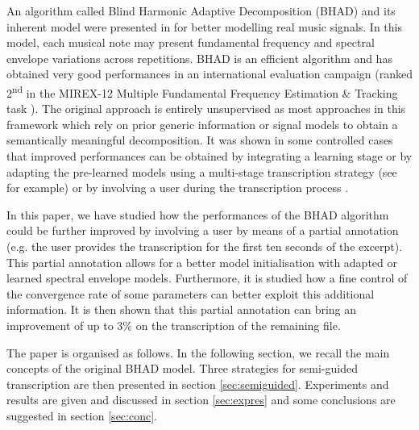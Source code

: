 \documentclass{article}
\begin{document}
\vspace{0.1cm}

An algorithm called Blind Harmonic Adaptive Decomposition (BHAD) and its inherent model were presented in \cite{Fuentes2012_EUSIPCO, Fuentes2013_PhD} for better modelling real music signals. In this model, each musical note may present fundamental frequency and spectral envelope variations across repetitions. BHAD is an efficient algorithm and has obtained very good performances in an international evaluation campaign (ranked 2\textsuperscript{nd} in the MIREX-12 Multiple Fundamental Frequency Estimation \& Tracking task \cite{MIREX2012}). 
The original approach is entirely unsupervised as most approaches in this framework which rely on prior generic information or signal models to obtain a semantically meaningful decomposition. It was shown in some controlled cases that improved performances can be obtained by integrating a learning stage or by adapting the pre-learned models using a multi-stage transcription strategy (see \cite{BenetosISMIR2014} for example) or by involving a user during the transcription process \cite{Kirchhoff13}.

\vspace{0.1cm}

In this paper, we have studied how the performances of the BHAD algorithm could be further improved by involving a user by means of a partial annotation (e.g. the user provides the transcription for the first ten seconds of the excerpt). This partial annotation allows for a better model initialisation with adapted or learned spectral envelope models. Furthermore, it is studied how a fine control of the convergence rate of some parameters can better exploit this additional information. It is then shown that this partial annotation can bring an improvement of up to 3\% on the transcription of the remaining file.  %

\vspace{0.1cm}
The paper is organised as follows. In the following section, we recall the main concepts of the original BHAD model. Three strategies for semi-guided transcription are then presented in section \ref{sec:semiguided}. Experiments and results are given and discussed in section \ref{sec:expres} and some conclusions are suggested in section \ref{sec:conc}.  
\end{document}

